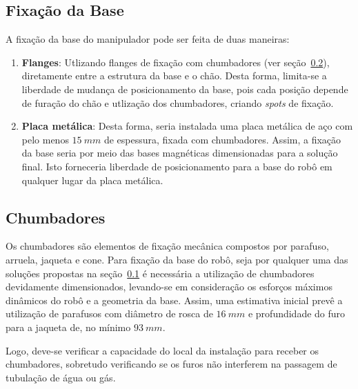 \subsection{Fixação da Base}\label{sec::fix_base}

A fixação da base do manipulador pode ser feita de duas maneiras:

\begin{enumerate}
  \item \textbf{Flanges}: Utlizando flanges de fixação com chumbadores (ver
  seção~\ref{sec::chumbadores}), diretamente entre a estrutura da base e o chão.
  Desta forma, limita-se a liberdade de mudança de posicionamento da base, pois 
  cada posição depende de furação do chão e utlização dos chumbadores, criando \textit{spots} de fixação.
  \item \textbf{Placa metálica}: Desta forma, seria instalada uma placa metálica
  de aço com pelo menos $15~mm$ de espessura, fixada com chumbadores. Assim, a
  fixação da base seria por meio das bases magnéticas dimensionadas para
  a solução final. Isto forneceria liberdade de posicionamento para a base do
  robô em qualquer lugar da placa metálica.
\end{enumerate}

 
 \subsection{Chumbadores}\label{sec::chumbadores}
 
 Os chumbadores são elementos de fixação mecânica compostos por parafuso,
 arruela, jaqueta e cone.
 Para fixação da base do robô, seja por qualquer uma
 das soluções propostas na seção~\ref{sec::fix_base} é necessária a utilização 
 de chumbadores devidamente dimensionados, levando-se em consideração os
 esforços  máximos dinâmicos do robô e a geometria da base.
 Assim, uma estimativa inicial prevê a utilização de parafusos com diâmetro de
 rosca de $16~mm$ e profundidade do furo para a jaqueta de, no mínimo $93~mm$.
 
 Logo, deve-se verificar a capacidade do local da instalação para receber os
 chumbadores, sobretudo verificando se os furos não interferem na passagem de
 tubulação de água ou gás.
 
